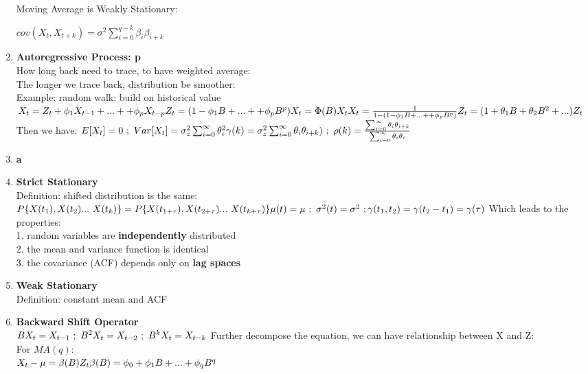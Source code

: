 \documentclass[10pt,landscape]{article}
\begin{document}
\begin{multicols}{3}
\begin{enumerate}
  		Moving Average is Weakly Stationary:
  		
  		$
  		cov(X_t,X_{t+k}) = \sigma^2 \sum_{i=0}^{q-k}\beta_i\beta_{i+k}
  		$
  
  \item \textbf{Autoregressive Process: p}\\
  		How long back need to trace, to have weighted average:\\
  		The longer we trace back, distribution be smoother:\\
  		Example: random walk: build on historical value\\
		$
		X_t = Z_t + \phi_1X_{t-1} + ... + + \phi_pX_{t-p}\\
		Z_t = (1-\phi_1B + ... + + \phi_pB^p)X_{t}= \Phi(B)X_t\\
		X_t = \frac{1}{1-(1-\phi_1B + ... + + \phi_pB^p)}Z_t = (1+\theta_1B+\theta_2B^2+...)Z_t
		$
		\newline
		\newline
		Then we have:
		$
		E[X_t] = 0 \ ;\ Var[X_t] = \sigma_z^2 \sum_{i=0}^{\infty}\theta_i^2\\
		\gamma(k) = \sigma_z^2 \sum_{i=0}^{\infty} \theta_i\theta_{i+k}) \ ;\ \rho(k) = \frac{\sum_{i=0}^{\infty} \theta_i\theta_{i+k}}{\sum_{i=0}^{\infty} \theta_i\theta_{i}}
		$
		
  		
  \item \textbf{a}
  		
  \item \textbf{Strict Stationary}\\
		Definition: shifted distribution is the same:\\
		$
		P\{X(t_1), X(t_2) ...\ X(t_k)\} = P\{X(t_{1+\tau}), X(t_{2+\tau}) ...\ X(t_{k+\tau})\}\newline
		\mu(t) = \mu \ ; \ \sigma^2(t) = \sigma^2 \ ; \gamma(t_1,t_2) = \gamma(t_2-t_1) = \gamma(\tau)
		$
		Which leads to the properties:\\
		1. random variables are \textbf{independently} distributed\\
		2. the mean and variance function is identical\\
		3. the covariance (ACF) depends only on \textbf{lag spaces}
  \item \textbf{Weak Stationary}\\
  		Definition: constant mean and ACF
  \item \textbf{Backward Shift Operator}\\
  		$
  		BX_t = X_{t-1} \ ; \ B^2X_t = X_{t-2} \ ; \ B^kX_t = X_{t-k}\\
  		$
  		Further decompose the equation, we can have relationship between X and Z:\\
  		For $MA(q)$:\\
  		$
  		X_t - \mu = \beta(B)Z_t\\
  		\beta(B) = \phi_0 + \phi_1B+ ... + \phi_qB^q
  		$
  		

\end{enumerate}
\end{multicols}
\end{document}
